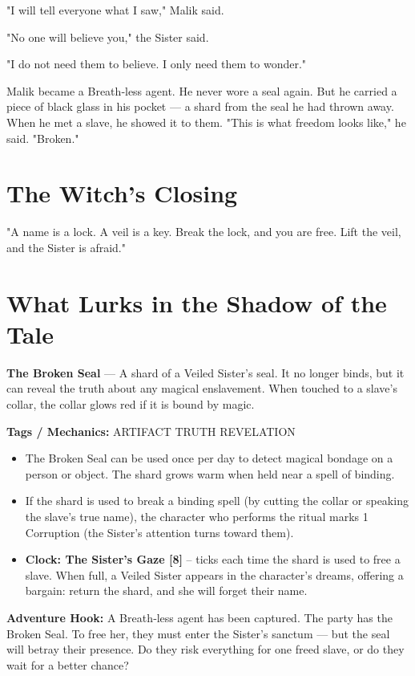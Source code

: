 \documentclass[10pt,twoside]{book}
\newcommand{\tag}[1]{\textsc{#1}}
\begin{document}
"I will tell everyone what I saw," Malik said.

"No one will believe you," the Sister said.

"I do not need them to believe. I only need them to wonder."

Malik became a Breath‑less agent. He never wore a seal again. But he carried a piece of black glass in his pocket --- a shard from the seal he had thrown away. When he met a slave, he showed it to them. "This is what freedom looks like," he said. "Broken."

\section*{The Witch's Closing}
"A name is a lock. A veil is a key. Break the lock, and you are free. Lift the veil, and the Sister is afraid."

\section*{What Lurks in the Shadow of the Tale}
\begin{infobox}
\textbf{The Broken Seal} --- A shard of a Veiled Sister's seal. It no longer binds, but it can reveal the truth about any magical enslavement. When touched to a slave's collar, the collar glows red if it is bound by magic.

\textbf{Tags / Mechanics:} \tag{ARTIFACT} \tag{TRUTH} \tag{REVELATION}

\begin{itemize}
\item The Broken Seal can be used once per day to detect magical bondage on a person or object. The shard grows warm when held near a spell of binding.
\item If the shard is used to break a binding spell (by cutting the collar or speaking the slave's true name), the character who performs the ritual marks 1 Corruption (the Sister's attention turns toward them).
\item \textbf{Clock: The Sister's Gaze [8]} -- ticks each time the shard is used to free a slave. When full, a Veiled Sister appears in the character's dreams, offering a bargain: return the shard, and she will forget their name.
\end{itemize}

\textbf{Adventure Hook:} A Breath‑less agent has been captured. The party has the Broken Seal. To free her, they must enter the Sister's sanctum --- but the seal will betray their presence. Do they risk everything for one freed slave, or do they wait for a better chance?
\end{infobox}
\end{document}
